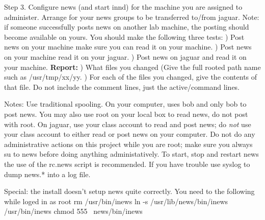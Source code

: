 Step 3. Configure news (and start {\ltt{}innd}) for the machine you are
assigned to administer.
Arrange for your news groups to be transferred to/from {\ltt{}jaguar}.
Note: if someone successfully posts news on another lab machine, the posting
should become available on yours.
You should make the following three tests:
\hfill{}) Post news on your machine make sure you can read it
on your machine.
\hfill{}) Post news on your machine read it on your {\ltt{}jaguar}.
\hfill{}) Post news on {\ltt{}jaguar} and read it on your machine.
\hfill\break
{\bf Report:}
\hfill{}) What files you changed (Give the full rooted path name such as
{\ltt{}/usr/tmp/xx/yy}.
\hfill{}) For each of the files you changed, give the contents of that file.
Do not include the comment lines, just the active/command lines.

Notes: Use traditional spooling. On your computer, uses {\ltt{}bob}
and only {\ltt{}bob} to post news. You may also use root on
your local box to read news, do not post with root.
On jaguar, use your class account to read and post news;
do {\it not} use your class account to either read or post news on your
computer. Do not do any administrative actions on this project
while you are root; make sure you always {\ltt{}su} to news before
doing anything administatively. To start, stop and restart news
the use of the {\ltt{}rc.news} script is recommended.
If you have trouble use syslog to dump {\ltt{}news.*} into a log file.

Special: the install doesn't setup news quite correctly. You need to the following
while loged in as root
\hfill\break
{\ltt{}rm /usr/bin/inews}
\hfill\break
{\ltt{}ln -s /usr/lib/news/bin/inews /usr/bin/inews}
\hfill\break
{\ltt{}chmod 555 ~news/bin/inews}

\bye
